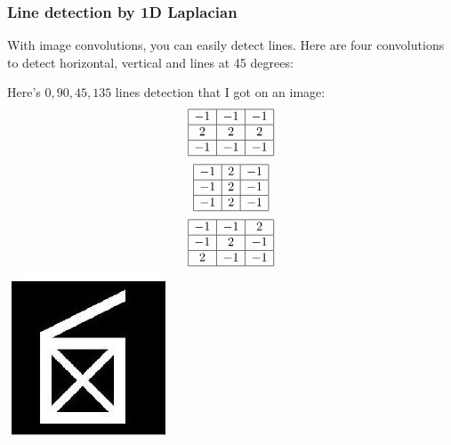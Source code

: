 \documentclass[10pt]{article}
\begin{document}
\subsubsection{Line detection by 1D Laplacian}
With image convolutions, you can easily detect lines. Here are four convolutions to detect horizontal, vertical and lines at 45 degrees:

Here's $0,90,45,135$ lines detection that I got on an image:
$$
\begin{array}{|c|c|c|}
\hline-1 & -1 & -1 \\
\hline 2 & 2 & 2 \\
\hline-1 & -1 & -1 \\
\hline
\end{array}
$$
$$
\begin{array}{|c|c|c|}
\hline-1 & 2 & -1 \\
\hline-1 & 2 & -1 \\
\hline-1 & 2 & -1 \\
\hline
\end{array}
$$
$$
\begin{array}{|c|c|c|}
\hline-1 & -1 & 2 \\
\hline-1 & 2 & -1 \\
\hline 2 & -1 & -1 \\
\hline
\end{array}
$$
\includegraphics[max width=\textwidth]{2022_01_06_b5ce182ed1bd5f482e5bg-09}
\end{document}
